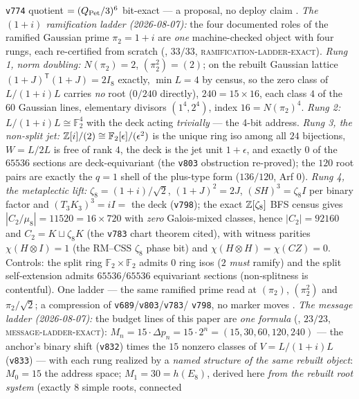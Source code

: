 \texttt{v774} quotient $=(Q_{\rm Pet}/3)^6$ bit-exact --- a
proposal, no deploy claim \mE.
\emph{The $(1{+}i)$ ramification ladder (2026-08-07):} the four
documented roles of the ramified Gaussian prime $\pi_2=1{+}i$ are
\emph{one} machine-checked object with four rungs, each
re-certified from scratch
(, $33/33$,
\textsc{ramification-ladder-exact}).  \emph{Rung 1, norm
doubling:} $N(\pi_2)=2$, $(\pi_2^2)=(2)$; on the rebuilt Gaussian
lattice $(1{+}J)^{\mathsf T}(1{+}J)=2I_8$ exactly, $\min L=4$ by
census, so the zero class of $L/(1{+}i)L$ carries \emph{no} root
($0/240$ directly), $240=15\times16$, each class $4$ of the $60$
Gaussian lines, elementary divisors $(1^4,2^4)$, index
$16=N(\pi_2)^4$.  \emph{Rung 2:} $L/(1{+}i)L\cong\mathbb F_2^4$
with the deck acting \emph{trivially} --- the 4-bit address.
\emph{Rung 3, the non-split jet:}
$\mathbb{Z}[i]/(2)\cong\mathbb F_2[\epsilon]/(\epsilon^2)$ is the unique
ring iso among all $24$ bijections, $W=L/2L$ is free of rank $4$,
the deck is the jet unit $1{+}\epsilon$, and exactly $0$ of the
$65536$ sections are deck-equivariant (the \texttt{v803}
obstruction re-proved); the $120$ root pairs are exactly the
$q=1$ shell of the plus-type form ($136/120$, Arf $0$).
\emph{Rung 4, the metaplectic lift:} $\zeta_8=(1{+}i)/\sqrt2$,
$(1{+}J)^2=2J$, $(SH)^3=\zeta_8I$ per binary factor and
$(T_3K_3)^3=iI=$ the deck (\texttt{v798}); the exact
$\mathbb{Z}[\zeta_8]$ BFS census gives $|C_2/\mu_8|=11520=16\times720$
with \emph{zero} Galois-mixed classes, hence $|C_2|=92160$ and
$C_2=K\sqcup\zeta_8K$ (the \texttt{v783} chart theorem cited),
with witness parities $\chi(H{\otimes}I)=1$ (the RM--CSS
$\zeta_8$ phase bit) and $\chi(H{\otimes}H)=\chi(CZ)=0$.
Controls: the split ring $\mathbb F_2\times\mathbb F_2$ admits
$0$ ring isos ($2$ \emph{must} ramify) and the split
self-extension admits $65536/65536$ equivariant sections
(non-splitness is contentful).  One ladder --- the same ramified
prime read at $(\pi_2)$, $(\pi_2^2)$ and $\pi_2/\sqrt2$; a
compression of \texttt{v689}/\texttt{v803}/\texttt{v783}/%
\texttt{v798}, no marker moves \mE.
\emph{The message ladder (2026-08-07):} the budget lines of this
paper are \emph{one formula}
(, $23/23$,
\textsc{message-ladder-exact}): $M_n = 15\cdot\Delta p_n =
15\cdot2^n = (15, 30, 60, 120, 240)$ --- the anchor's binary
shift (\texttt{v832}) times the $15$ nonzero classes of
$V = L/(1{+}i)L$ (\texttt{v833}) --- with each rung realized by a
\emph{named structure of the same rebuilt object}: $M_0 = 15$ the
address space; $M_1 = 30 = h(E_8)$, derived here \emph{from the
rebuilt root system} (exactly $8$ simple roots, connected
